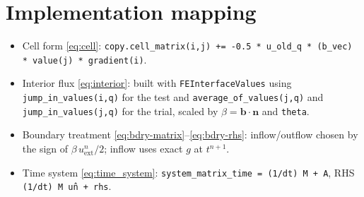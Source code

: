 \documentclass[11pt]{article}
\begin{document}
\section{Implementation mapping}
\begin{itemize}
  \item Cell form \eqref{eq:cell}: \texttt{copy.cell\_matrix(i,j) += -0.5 * u\_old\_q * (b\_vec) * value(j) * gradient(i)}.
  \item Interior flux \eqref{eq:interior}: built with \texttt{FEInterfaceValues} using \texttt{jump\_in\_values(i,q)} for the test and \texttt{average\_of\_values(j,q)} and \texttt{jump\_in\_values(j,q)} for the trial, scaled by $\beta=\bm b\!\cdot\!\bm n$ and \texttt{theta}.
  \item Boundary treatment \eqref{eq:bdry-matrix}--\eqref{eq:bdry-rhs}: inflow/outflow chosen by the sign of $\beta\,u_{\text{ext}}^n/2$; inflow uses exact $g$ at $t^{n+1}$.
  \item Time system \eqref{eq:time_system}: \texttt{system\_matrix\_time = (1/dt) M + A}, RHS \texttt{(1/dt) M u\^n + rhs}.
\end{itemize}
\end{document}
